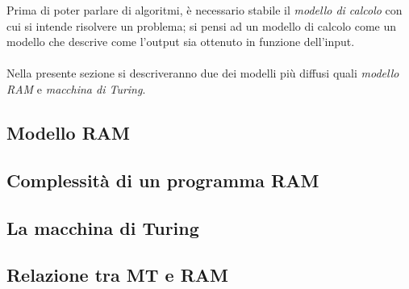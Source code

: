 \documentclass{subfiles}
\begin{document}
Prima di poter parlare di algoritmi, è necessario stabile il \emph{modello di calcolo} con cui si intende risolvere un problema;
si pensi ad un modello di calcolo come un modello che descrive come l'output sia ottenuto in funzione dell'input.
\\ \\
Nella presente sezione si descriveranno due dei modelli più diffusi quali \emph{modello RAM} e \emph{macchina di Turing}.

\subsection{Modello RAM}

\clearpage

\subsection{Complessità di un programma RAM}

\clearpage

\subsection{La macchina di Turing}

\clearpage

\subsection{Relazione tra MT e RAM}

\end{document}
